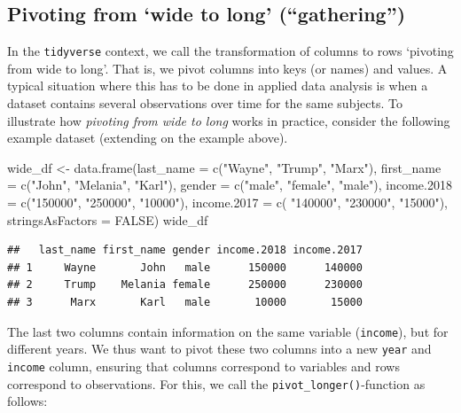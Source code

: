 \documentclass[
  12pt,
]{style/krantz}
\newenvironment{Shaded}{\begin{snugshade}}{\end{snugshade}}
\newcommand{\AttributeTok}[1]{\textcolor[rgb]{0.77,0.63,0.00}{#1}}
\newcommand{\ConstantTok}[1]{\textcolor[rgb]{0.00,0.00,0.00}{#1}}
\newcommand{\FunctionTok}[1]{\textcolor[rgb]{0.00,0.00,0.00}{#1}}
\newcommand{\NormalTok}[1]{#1}
\newcommand{\OtherTok}[1]{\textcolor[rgb]{0.56,0.35,0.01}{#1}}
\newcommand{\StringTok}[1]{\textcolor[rgb]{0.31,0.60,0.02}{#1}}
\begin{document}
\hypertarget{pivoting-from-wide-to-long-gathering}{%
\subsection{Pivoting from `wide to long' (``gathering'')}\label{pivoting-from-wide-to-long-gathering}}

In the \texttt{tidyverse} context, we call the transformation of columns to rows `pivoting from wide to long'. That is, we pivot columns into keys (or names) and values. A typical situation where this has to be done in applied data analysis is when a dataset contains several observations over time for the same subjects. To illustrate how \emph{pivoting from wide to long} works in practice, consider the following example dataset (extending on the example above).

\begin{Shaded}
\begin{Highlighting}[]
\NormalTok{wide\_df }\OtherTok{\textless{}{-}} \FunctionTok{data.frame}\NormalTok{(}\AttributeTok{last\_name =} \FunctionTok{c}\NormalTok{(}\StringTok{"Wayne"}\NormalTok{, }\StringTok{"Trump"}\NormalTok{, }\StringTok{"Marx"}\NormalTok{),}
                       \AttributeTok{first\_name =} \FunctionTok{c}\NormalTok{(}\StringTok{"John"}\NormalTok{, }\StringTok{"Melania"}\NormalTok{, }\StringTok{"Karl"}\NormalTok{),}
                       \AttributeTok{gender =} \FunctionTok{c}\NormalTok{(}\StringTok{"male"}\NormalTok{, }\StringTok{"female"}\NormalTok{, }\StringTok{"male"}\NormalTok{),}
                       \AttributeTok{income.2018 =} \FunctionTok{c}\NormalTok{(}\StringTok{"150000"}\NormalTok{, }\StringTok{"250000"}\NormalTok{, }\StringTok{"10000"}\NormalTok{),}
                      \AttributeTok{income.2017 =} \FunctionTok{c}\NormalTok{( }\StringTok{"140000"}\NormalTok{, }\StringTok{"230000"}\NormalTok{, }\StringTok{"15000"}\NormalTok{),}
                      \AttributeTok{stringsAsFactors =} \ConstantTok{FALSE}\NormalTok{)}
\NormalTok{wide\_df}
\end{Highlighting}
\end{Shaded}

\begin{verbatim}
##   last_name first_name gender income.2018 income.2017
## 1     Wayne       John   male      150000      140000
## 2     Trump    Melania female      250000      230000
## 3      Marx       Karl   male       10000       15000
\end{verbatim}

The last two columns contain information on the same variable (\texttt{income}), but for different years. We thus want to pivot these two columns into a new \texttt{year} and \texttt{income} column, ensuring that columns correspond to variables and rows correspond to observations. For this, we call the \texttt{pivot\_longer()}-function as follows:
\end{document}
